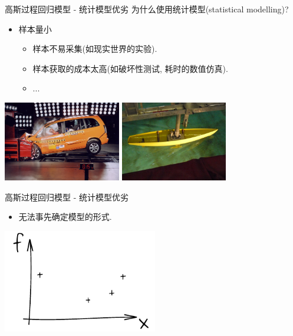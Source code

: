 \documentclass[10pt,mathserif]{beamer}
\theoremstyle{definition}
\numberwithin{equation}{section} %
\begin{document}

    \begin{frame}[fragile]{高斯过程回归模型 - 统计模型优劣}
        \vspace{2ex}
        为什么使用统计模型(statistical modelling)?
        \vspace{2ex}
        \begin{itemize}
            \item 样本量小
            \begin{itemize}
                \item 样本不易采集(如现实世界的实验).
                \item 样本获取的成本太高(如破坏性测试, 耗时的数值仿真).
                \item ...
            \end{itemize}
        \end{itemize}
        \begin{exampleblock}{}
            \begin{center}
            \includegraphics[height=3.5cm]{fig/crash-test} 
            \includegraphics[height=3.5cm]{fig/carene}
            \end{center}
        \end{exampleblock}

    \end{frame}

    \begin{frame}{高斯过程回归模型 - 统计模型优劣}
        \begin{itemize}
            \item 无法事先确定模型的形式.
        \end{itemize}

        \begin{center}
            \includegraphics[height=4.5cm]{fig/ink_fX}
        \end{center}
    \end{frame}
\end{document}
